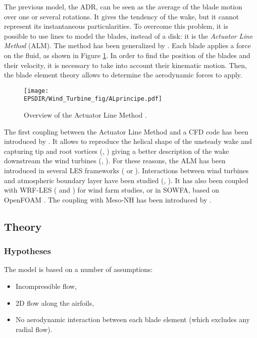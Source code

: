 The previous model, the ADR, can be seen as the average of the blade motion over one or several rotations. It gives the tendency of the wake, but it cannot represent its instantaneous particularities. To overcome this problem, it is possible to use lines to model the blades, instead of a disk: it is the \textit{Actuator Line Method} (ALM). The method has been generalized by \citet{sorensen2002numerical}. Each blade applies a force on the fluid, as shown in Figure \ref{fig:AL_principe}. In order to find the position of the blades and their velocity, it is necessary to take into account their kinematic motion. Then, the blade element theory allows to determine the aerodynamic forces to apply.

\begin{figure}[h]
\centering
\texttt{[image: \\EPSDIR/Wind\_Turbine\_fig/ALprincipe.pdf]}
\caption{Overview of the Actuator Line Method \citet{joulin2019modelisation}.}  
\label{fig:AL_principe}
\end{figure}
\medbreak
The first coupling between the Actuator Line Method and a CFD code has been introduced by \citet{mikkelsen2003actuator}. It allows to reproduce the helical shape of the unsteady wake and capturing tip and root vortices (\citet{ivanell2007numerical}, \citet{ivanell2007numericalv}) giving a better description of the wake downstream the wind turbines (\citet{Ivanell2009}, \citet{Troldborg2009}).
\medbreak
For these reasons, the ALM has been introduced in several LES frameworks (\citet{porte2011large} or \citet{tabib2017near}). Interactions between wind turbines and atmospheric boundary layer have been studied (\citet{lu2011large}, \citet{lu2015impact}). It has also been coupled with WRF-LES (\citet{marjanovic2015simulation} and \citet{marjanovic2017implementation}) for wind farm studies, or in SOWFA, based on OpenFOAM  \citet{Churchfield2012}. The coupling with Meso-NH has been introduced by \citet{joulin2020theactuator}.


\subsection{Theory}
\subsubsection*{Hypotheses}
\label{ss:hypALM}
The model is based on a number of assumptions:
\begin{itemize}
\item Incompressible flow,
\item 2D flow along the airfoils,
\item No aerodynamic interaction between each blade element (which excludes any radial flow).
\end{itemize}
